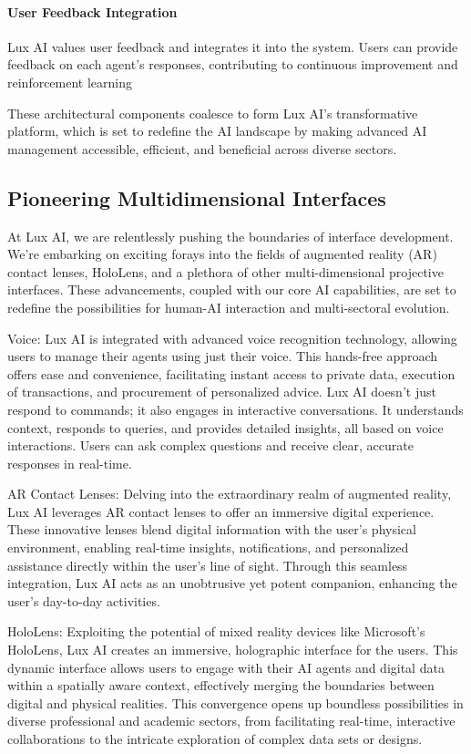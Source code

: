 \documentclass[11pt]{article}
\begin{document}
\paragraph{User Feedback Integration}

Lux AI values user feedback and integrates it into the system. Users can provide feedback on each agent's responses, contributing to continuous improvement and reinforcement learning


These architectural components coalesce to form Lux AI's transformative platform, which is set to redefine the AI landscape by making advanced AI management accessible, efficient, and beneficial across diverse sectors.


\subsection{Pioneering Multidimensional Interfaces}

At Lux AI, we are relentlessly pushing the boundaries of interface development. We're embarking on exciting forays into the fields of augmented reality (AR) contact lenses, HoloLens, and a plethora of other multi-dimensional projective interfaces. These advancements, coupled with our core AI capabilities, are set to redefine the possibilities for human-AI interaction and multi-sectoral evolution.


Voice: Lux AI is integrated with advanced voice recognition technology, allowing users to manage their agents using just their voice. This hands-free approach offers ease and convenience, facilitating instant access to private data, execution of transactions, and procurement of personalized advice. Lux AI doesn't just respond to commands; it also engages in interactive conversations. It understands context, responds to queries, and provides detailed insights, all based on voice interactions. Users can ask complex questions and receive clear, accurate responses in real-time.


AR Contact Lenses: Delving into the extraordinary realm of augmented reality, Lux AI leverages AR contact lenses to offer an immersive digital experience. These innovative lenses blend digital information with the user's physical environment, enabling real-time insights, notifications, and personalized assistance directly within the user's line of sight. Through this seamless integration, Lux AI acts as an unobtrusive yet potent companion, enhancing the user's day-to-day activities.


HoloLens: Exploiting the potential of mixed reality devices like Microsoft's HoloLens, Lux AI creates an immersive, holographic interface for the users. This dynamic interface allows users to engage with their AI agents and digital data within a spatially aware context, effectively merging the boundaries between digital and physical realities. This convergence opens up boundless possibilities in diverse professional and academic sectors, from facilitating real-time, interactive collaborations to the intricate exploration of complex data sets or designs.
\end{document}
